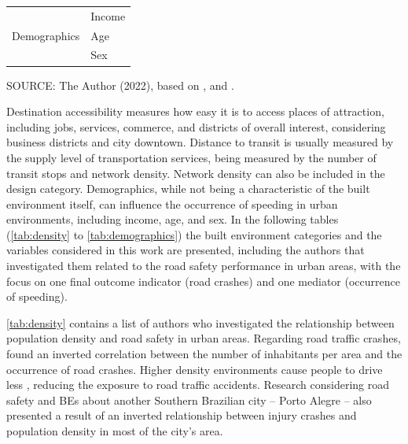 \begin{table}[!hbtp]
\begin{tabular}{ll}
                                                    \hline
        \multirow{3}{*}{Demographics}              & Income                                   \\
                                                   & Age                                      \\
                                                   & Sex                                      \\ \hline
        \end{tabular}
    \label{tab:6d}
    \par \vspace{2mm} \footnotesize \raggedright
    SOURCE: The Author (2022), based on \textcite{Ewing2009}, \textcite{Ewing2010} and \textcite{Obelheiro2020}.
\end{table}

Destination accessibility measures how easy it is to access places of attraction, including jobs, services, commerce, and districts of overall interest, considering business districts and city downtown. Distance to transit is usually measured by the supply level of transportation services, being measured by the number of transit stops and network density. Network density can also be included in the design category. Demographics, while not being a characteristic of the built environment itself, can influence the occurrence of speeding in urban environments, including income, age, and sex. In the following tables (\autoref{tab:density} to \autoref{tab:demographics}) the built environment categories and the variables considered in this work are presented, including the authors that investigated them related to the road safety performance in urban areas, with the focus on one final outcome indicator (road crashes) and one mediator (occurrence of speeding).



\autoref{tab:density} contains a list of authors who investigated the relationship between population density and road safety in urban areas. Regarding road traffic crashes, \textcite{Dumbaugh2009, Obelheiro2020} found an inverted correlation between the number of inhabitants per area and the occurrence of road crashes. Higher density environments cause people to drive less \cite{Dumbaugh2009}, reducing the exposure to road traffic accidents. Research considering road safety and BEs about another Southern Brazilian city – Porto Alegre – also presented a result of an inverted relationship between injury crashes and population density in most of the city's area.

